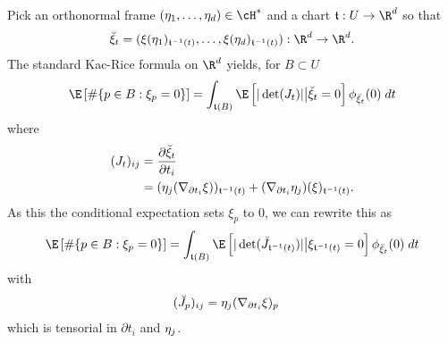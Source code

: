 \documentclass{article}
\newcommand{\randsec}{\xi}
\begin{document}
\begin{eqaution}
Pick an orthonormal frame $(\ONF_1, \dots, \ONF_d) \in \cH^*$ and a chart
$\coordchart:U \to \R^d$ so that
$$
\breve{\randsec}_t = (\randsec(\ONF_1)_{\coordchart^{-1}(t)}, \dots, \randsec(\ONF_d)_{\coordchart^{-1}(t)}): \R^d \to \R^d.
$$
The standard Kac-Rice formula on $\R^d$ yields, for $B \subset U$
$$
\begin{aligned}
\E \left[ \#\{p \in B: \randsec_p=0\} \right] &= \int_{\coordchart(B)} \E\left[|\det(J_t)| \bigr | \breve{\randsec}_t=0 \right] \phi_{\breve{\randsec}_t}(0) \; dt \\
\end{aligned}
$$
where
$$
\begin{aligned}
  (J_t)_{ij} &= \frac{\partial \breve{\randsec}_t}{\partial t_i} \\
  &= (\ONF_j(\nabla_{\partial t_i}\randsec))_{\coordchart^{-1}(t)} + (\nabla_{\partial t_i} \ONF_j)(\randsec)_{\coordchart^{-1}(t)}. \\
\end{aligned}
$$
As this the conditional expectation sets $\randsec_p$ to 0, we can rewrite this as
$$
\begin{aligned}
\E \left[\# \{p \in B: \randsec_p=0\} \right] &= \int_{\coordchart(B)} \E \left[|\det(\breve{J}_{\coordchart^{-1}(t)})| \bigr | \randsec_{\coordchart^{-1}(t)}=0 \right] \phi_{\breve{\randsec}_t}(0) \; dt \\
\end{aligned}
$$
with
$$
\begin{aligned}
  (\breve{J}_p)_{ij} &= \ONF_j(\nabla_{\partial t_i}\randsec)_{p}
\end{aligned}
$$
which is tensorial in $\partial t_i$ and $\eta_j$.



\end{eqaution}
\end{document}
